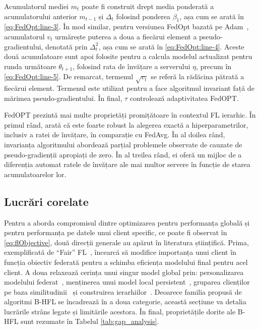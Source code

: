 Acumulatorul mediei $m_t$ poate fi construit drept media ponderată a acumulatorului anterior $m_{t-1}$ și $\Delta_t$ folosind ponderea $\beta_1$, așa cum se arată în \cref{eq:FedOpt:line-3}. În mod similar, pentru versiunea FedOpt bazată pe Adam~\citep{Adam}, acumulatorul $v_t$  urmărește puterea a doua a fiecărui element a pseudo-gradientului, denotată prin $\Delta_t^2$, așa cum se arată în \cref{eq:FedOpt:line-4}. Aceste două acumulatoare sunt apoi folosite pentru a calcula modelul actualizat pentru runda următoare $\theta_{t+1}$, folosind rata de învățare a serverului $\eta$, precum în \cref{eq:FedOpt:line-5}. De remarcat, termenul $\sqrt{v_t}$ se referă la rădăcina pătrată a fiecărui element. Termenul este utilizat pentru a face algoritmul invariant față de mărimea pseudo-gradientului. În final, $\tau$ controlează adaptivitatea FedOPT\@.

FedOPT prezintă mai multe proprietăți promițătoare în contextul FL ierarhic. În primul rând, \citet{FedOPT} arată că este foarte robust la alegerea exactă a hiperparametrilor, inclusiv a ratei de învățare, în comparație cu FedAvg. În al doilea rând, invarianța algoritmului abordează parțial problemele observate de \citet{LargeCohorts} cauzate de pseudo-gradienții apropiați de zero. În al treilea rând, ei oferă un mijloc de a diferenția automat ratele de învățare ale mai multor servere în funcție de starea acumulatoarelor lor.

\subsection{Lucrări corelate}

Pentru a aborda compromisul dintre optimizarea pentru performanța globală și pentru performanța pe datele unui client specific, ce poate fi observat în \cref{eq:flObjective}, două direcții generale au apărut în literatura științifică. Prima, exemplificată de ``Fair'' FL~\citep{QFedAvg}, încearcă să modifice importanța unui client în funcția obiectiv federată pentru a schimba eficiența modelului final pentru acel client. A doua relaxează cerința unui singur model global prin: personalizarea modelului federat~\citep{SalvagingFL,FLwithNonIID}, menținerea unui model local persistent~\citep{Ditto}, gruparea clienților pe baza similitudinii~\citep{ThreeApproachesMansour} și construirea ierarhiilor~\citep{Client-Edge-CloudHierFL,Hier_Het_Cellular}. Deoarece familia propusă de algoritmi B-HFL se încadrează în a doua categorie, această secțiune va detalia lucrările strâns legate și limitările acestora. În final, proprietățile dorite ale B-HFL sunt rezumate în Tabelul \ref{tab:gap_analysis}.


